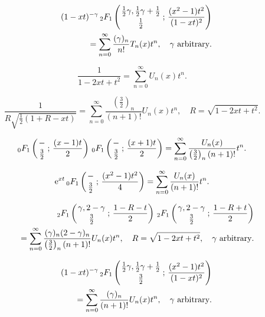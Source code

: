 \documentclass[envcountchap,graybox]{svmono}
\newcommand{\hyp}[5]{\mbox{}_{#1}{F}_{#2}
\left(\genfrac{}{}{0pt}{}{#3}{#4}\,;\,#5\right)}
\newcommand{\e}{\textrm{e}}
\newcommand{\hyp}[5]{\,\mbox{}_{#1}F_{#2}\!\left(
  \genfrac{}{}{0pt}{}{#3}{#4};#5\right)}
\begin{document}
\begin{eqnarray}
\label{GenChebyshevI6}
& &(1-xt)^{-\gamma}\,\hyp{2}{1}{\frac{1}{2}\gamma,\frac{1}{2}\gamma+\frac{1}{2}}{\frac{1}{2}}
{\frac{(x^2-1)t^2}{(1-xt)^2}}\nonumber\\
& &=\sum_{n=0}^{\infty}\frac{(\gamma)_n}{n!}T_n(x)t^n,\quad\textrm{$\gamma$ arbitrary}.
\end{eqnarray}

\begin{equation}
\label{GenChebyshevII1}
\frac{1}{1-2xt+t^2}=\sum_{n=0}^{\infty}U_n(x)t^n.
\end{equation}

\begin{equation}
\label{GenChebyshevII2}
\frac{1}{R\sqrt{\frac{1}{2}(1+R-xt)}}=\sum_{n=0}^{\infty}
\frac{\left(\frac{3}{2}\right)_n}{(n+1)!}U_n(x)t^n,\quad R=\sqrt{1-2xt+t^2}.
\end{equation}

\begin{equation}
\label{GenChebyshevII3}
\hyp{0}{1}{-}{\frac{3}{2}}{\frac{(x-1)t}{2}}\,
\hyp{0}{1}{-}{\frac{3}{2}}{\frac{(x+1)t}{2}}=
\sum_{n=0}^{\infty}\frac{U_n(x)}{\left(\frac{3}{2}\right)_n(n+1)!}t^n.
\end{equation}

\begin{equation}
\label{GenChebyshevII4}
\e^{xt}\,\hyp{0}{1}{-}{\frac{3}{2}}{\frac{(x^2-1)t^2}{4}}=
\sum_{n=0}^{\infty}\frac{U_n(x)}{(n+1)!}t^n.
\end{equation}

\begin{eqnarray}
\label{GenChebyshevII5}
& &\hyp{2}{1}{\gamma,2-\gamma}{\frac{3}{2}}{\frac{1-R-t}{2}}\,
\hyp{2}{1}{\gamma,2-\gamma}{\frac{3}{2}}{\frac{1-R+t}{2}}\nonumber\\
& &{}=\sum_{n=0}^{\infty}\frac{(\gamma)_n(2-\gamma)_n}{\left(\frac{3}{2}\right)_n(n+1)!}U_n(x)t^n,
\quad R=\sqrt{1-2xt+t^2},\quad\textrm{$\gamma$ arbitrary}.
\end{eqnarray}

\begin{eqnarray}
\label{GenChebyshevII6}
& &(1-xt)^{-\gamma}\,\hyp{2}{1}{\frac{1}{2}\gamma,\frac{1}{2}\gamma+\frac{1}{2}}{\frac{3}{2}}
{\frac{(x^2-1)t^2}{(1-xt)^2}}\nonumber\\
& &{}=\sum_{n=0}^{\infty}\frac{(\gamma)_n}{(n+1)!}U_n(x)t^n,\quad\textrm{$\gamma$ arbitrary}.
\end{eqnarray}
\end{document}
